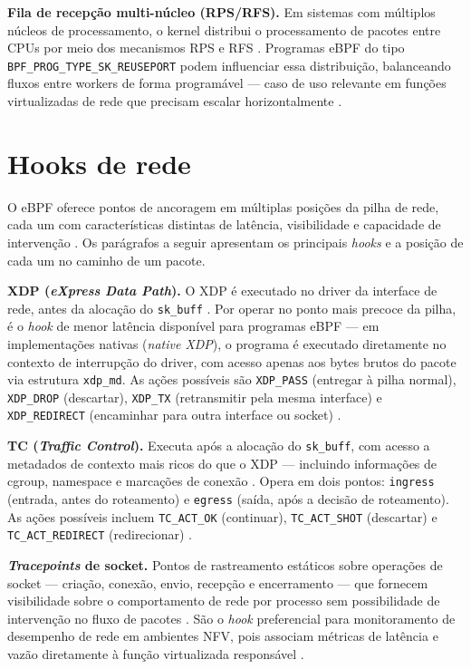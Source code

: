 \textbf{Fila de recepção multi-núcleo (RPS/RFS).}
Em sistemas com múltiplos núcleos de processamento, o kernel distribui o
processamento de pacotes entre CPUs por meio dos mecanismos RPS e RFS
\cite{linuxkernel2024}.
Programas eBPF do tipo \texttt{BPF\_PROG\_TYPE\_SK\_REUSEPORT} podem influenciar
essa distribuição, balanceando fluxos entre workers de forma programável ---
caso de uso relevante em funções virtualizadas de rede que precisam escalar
horizontalmente \cite{venancio2021}.

\section{Hooks de rede}

O eBPF oferece pontos de ancoragem em múltiplas posições da pilha de rede, cada um
com características distintas de latência, visibilidade e capacidade de intervenção
\cite{linuxkernel2024}.
Os parágrafos a seguir apresentam os principais \textit{hooks} e a posição de
cada um no caminho de um pacote.

\textbf{XDP (\textit{eXpress Data Path}).}
O XDP é executado no driver da interface de rede, antes da alocação do
\texttt{sk\_buff} \cite{linuxkernel2024}.
Por operar no ponto mais precoce da pilha, é o \textit{hook} de menor latência
disponível para programas eBPF --- em implementações nativas (\textit{native XDP}),
o programa é executado diretamente no contexto de interrupção do driver, com acesso
apenas aos bytes brutos do pacote via estrutura \texttt{xdp\_md}.
As ações possíveis são \texttt{XDP\_PASS} (entregar à pilha normal),
\texttt{XDP\_DROP} (descartar), \texttt{XDP\_TX} (retransmitir pela mesma interface)
e \texttt{XDP\_REDIRECT} (encaminhar para outra interface ou socket)
\cite{gregg2019}.

\textbf{TC (\textit{Traffic Control}).}
Executa após a alocação do \texttt{sk\_buff}, com acesso a metadados de contexto
mais ricos do que o XDP --- incluindo informações de cgroup, namespace e marcações
de conexão \cite{linuxkernel2024}.
Opera em dois pontos: \texttt{ingress} (entrada, antes do roteamento) e
\texttt{egress} (saída, após a decisão de roteamento).
As ações possíveis incluem \texttt{TC\_ACT\_OK} (continuar), \texttt{TC\_ACT\_SHOT}
(descartar) e \texttt{TC\_ACT\_REDIRECT} (redirecionar) \cite{cassagnes2020}.

\textbf{\textit{Tracepoints} de socket.}
Pontos de rastreamento estáticos sobre operações de socket --- criação, conexão,
envio, recepção e encerramento --- que fornecem visibilidade sobre o comportamento
de rede por processo sem possibilidade de intervenção no fluxo de pacotes
\cite{linuxkernel2024}.
São o \textit{hook} preferencial para monitoramento de desempenho de rede em
ambientes NFV, pois associam métricas de latência e vazão diretamente à função
virtualizada responsável \cite{venancio2021}.

